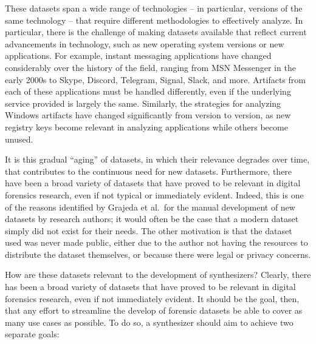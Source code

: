 These datasets span a wide range of technologies -- in particular,
versions of the same technology -- that require different methodologies
to effectively analyze. In particular, there is the challenge of making
datasets available that reflect current advancements in technology, such
as new operating system versions or new applications. For example,
instant messaging applications have changed considerably over the
history of the field, ranging from MSN Messenger in the early 2000s to
Skype, Discord, Telegram, Signal, Slack, and more. Artifacts from each
of these applications must be handled differently, even if the
underlying service provided is largely the same. Similarly, the
strategies for analyzing Windows artifacts have changed significantly
from version to version, as new registry keys become relevant in
analyzing applications while others become unused.

It is this gradual ``aging'' of datasets, in which their relevance
degrades over time, that contributes to the continuous need for new
datasets. Furthermore, there have been a broad variety of datasets that
have proved to be relevant in digital forensics research, even if not
typical or immediately evident. Indeed, this is one of the reasons
identified by Grajeda et al.~for the manual development of new datasets
by research authors; it would often be the case that a modern dataset
simply did not exist for their needs. The other motivation is that the
dataset used was never made public, either due to the author not having
the resources to distribute the dataset themselves, or because there
were legal or privacy concerns.

How are these datasets relevant to the development of synthesizers?
Clearly, there has been a broad variety of datasets that have proved to
be relevant in digital forensics research, even if not immediately
evident. It should be the goal, then, that any effort to streamline the
develop of forensic datasets be able to cover as many use cases as
possible. To do so, a synthesizer should aim to achieve two separate
goals:

